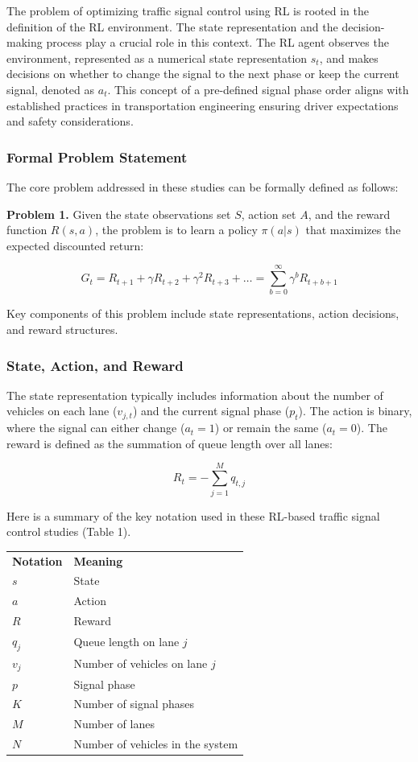 The problem of optimizing traffic signal control using RL is rooted in the definition of the RL environment. The state representation and the decision-making process play a crucial role in this context. The RL agent observes the environment, represented as a numerical state representation $s_t$, and makes decisions on whether to change the signal to the next phase or keep the current signal, denoted as $a_t$. This concept of a pre-defined signal phase order aligns with established practices in transportation engineering \cite{sutton1999between,urbanik2015signal} ensuring driver expectations and safety considerations.

\subsubsection{Formal Problem Statement}

The core problem addressed in these studies can be formally defined as follows:

\textbf{Problem 1.} Given the state observations set $S$, action set $A$, and the reward function $R(s, a)$, the problem is to learn a policy $\pi(a|s)$ that maximizes the expected discounted return:

\[
G_t = R_{t+1} + \gamma R_{t+2} + \gamma^2 R_{t+3} + \ldots = \sum_{b=0}^{\infty} \gamma^b R_{t+b+1}
\]

Key components of this problem include state representations, action decisions, and reward structures.

\subsubsection{State, Action, and Reward}

The state representation typically includes information about the number of vehicles on each lane ($v_{j,t}$) and the current signal phase ($p_t$). The action is binary, where the signal can either change ($a_t = 1$) or remain the same ($a_t = 0$). The reward is defined as the summation of queue length over all lanes:

\[
R_t = -\sum_{j=1}^M q_{t, j}
\]

Here is a summary of the key notation used in these RL-based traffic signal control studies (Table 1).

\begin{table}[h]
\centering
\begin{tabular}{ll}
\textbf{Notation} & \textbf{Meaning} \\
$s$ & State \\
$a$ & Action \\
$R$ & Reward \\
$q_j$ & Queue length on lane $j$ \\
$v_j$ & Number of vehicles on lane $j$ \\
$p$ & Signal phase \\
$K$ & Number of signal phases \\
$M$ & Number of lanes \\
$N$ & Number of vehicles in the system \\
\end{tabular}
\end{table}

